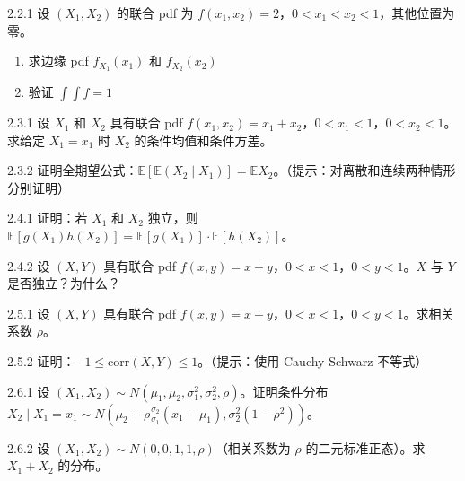 \begin{exercise}{2.2.1}
设 $(X_1, X_2)$ 的联合 pdf 为 $f(x_1, x_2) = 2$，$0 < x_1 < x_2 < 1$，其他位置为零。
\begin{enumerate}
\item 求边缘 pdf $f_{X_1}(x_1)$ 和 $f_{X_2}(x_2)$
\item 验证 $\int\int f = 1$
\end{enumerate}
\end{exercise}

\begin{exercise}{2.3.1}
设 $X_1$ 和 $X_2$ 具有联合 pdf $f(x_1, x_2) = x_1 + x_2$，$0 < x_1 < 1$，$0 < x_2 < 1$。求给定 $X_1 = x_1$ 时 $X_2$ 的条件均值和条件方差。
\end{exercise}

\begin{exercise}{2.3.2}
证明全期望公式：$\mathbb{E}[\mathbb{E}(X_2 \mid X_1)] = \mathbb{E}X_2$。（提示：对离散和连续两种情形分别证明）
\end{exercise}

\begin{exercise}{2.4.1}
证明：若 $X_1$ 和 $X_2$ 独立，则 $\mathbb{E}[g(X_1) h(X_2)] = \mathbb{E}[g(X_1)] \cdot \mathbb{E}[h(X_2)]$。
\end{exercise}

\begin{exercise}{2.4.2}
设 $(X, Y)$ 具有联合 pdf $f(x, y) = x + y$，$0 < x < 1$，$0 < y < 1$。$X$ 与 $Y$ 是否独立？为什么？
\end{exercise}

\begin{exercise}{2.5.1}
设 $(X, Y)$ 具有联合 pdf $f(x, y) = x + y$，$0 < x < 1$，$0 < y < 1$。求相关系数 $\rho$。
\end{exercise}

\begin{exercise}{2.5.2}
证明：$-1 \leq \text{corr}(X, Y) \leq 1$。（提示：使用 Cauchy-Schwarz 不等式）
\end{exercise}

\begin{exercise}{2.6.1}
设 $(X_1, X_2) \sim N(\mu_1, \mu_2, \sigma_1^2, \sigma_2^2, \rho)$。证明条件分布 $X_2 \mid X_1 = x_1 \sim N(\mu_2 + \rho\frac{\sigma_2}{\sigma_1}(x_1 - \mu_1), \sigma_2^2(1-\rho^2))$。
\end{exercise}

\begin{exercise}{2.6.2}
设 $(X_1, X_2) \sim N(0, 0, 1, 1, \rho)$（相关系数为 $\rho$ 的二元标准正态）。求 $X_1 + X_2$ 的分布。
\end{exercise}

